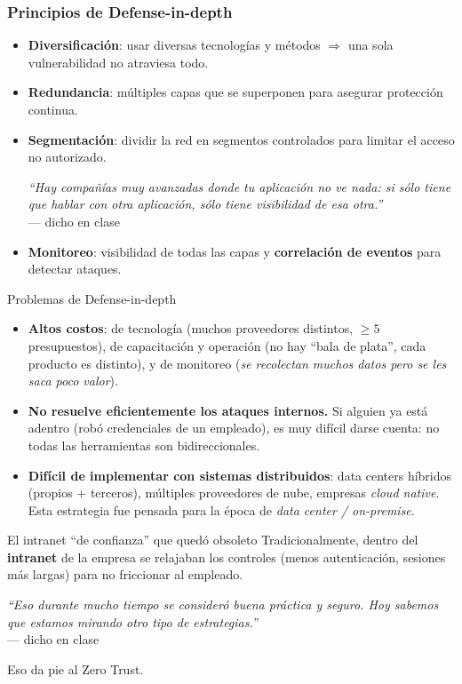 \documentclass[11pt,a4paper]{article}
\newcommand{\prof}[1]{\par\medskip\noindent\textit{``#1''}\\[-2pt]\hspace*{1em}%
  {\footnotesize\textcolor{black!60}{--- dicho en clase}}\par\medskip\noindent}
\begin{document}
\subsubsection{Principios de Defense-in-depth}
\begin{itemize}[leftmargin=1.4em,itemsep=2pt]
  \item \textbf{Diversificación}: usar diversas tecnologías y métodos $\Rightarrow$ una sola
        vulnerabilidad no atraviesa todo.
  \item \textbf{Redundancia}: múltiples capas que se superponen para asegurar protección continua.
  \item \textbf{Segmentación}: dividir la red en segmentos controlados para limitar el acceso no
        autorizado. \prof{Hay compañías muy avanzadas donde tu aplicación no ve nada: si sólo
        tiene que hablar con otra aplicación, sólo tiene visibilidad de esa otra.}
  \item \textbf{Monitoreo}: visibilidad de todas las capas y \textbf{correlación de eventos}
        para detectar ataques.
\end{itemize}

\begin{warnbox}{Problemas de Defense-in-depth}
\begin{itemize}[leftmargin=1.4em,itemsep=1pt]
  \item \textbf{Altos costos}: de tecnología (muchos proveedores distintos, $\geq 5$
        presupuestos), de capacitación y operación (no hay ``bala de plata'', cada producto es
        distinto), y de monitoreo (\emph{se recolectan muchos datos pero se les saca poco
        valor}).
  \item \textbf{No resuelve eficientemente los ataques internos.} Si alguien ya está adentro
        (robó credenciales de un empleado), es muy difícil darse cuenta: no todas las
        herramientas son bidireccionales.
  \item \textbf{Difícil de implementar con sistemas distribuidos}: data centers híbridos
        (propios + terceros), múltiples proveedores de nube, empresas \emph{cloud native}. Esta
        estrategia fue pensada para la época de \emph{data center / on-premise}.
\end{itemize}
\end{warnbox}

\begin{anecbox}{El intranet ``de confianza'' que quedó obsoleto}
Tradicionalmente, dentro del \textbf{intranet} de la empresa se relajaban los controles (menos
autenticación, sesiones más largas) para no friccionar al empleado. \prof{Eso durante mucho
tiempo se consideró buena práctica y seguro. Hoy sabemos que estamos mirando otro tipo de
estrategias.} Eso da pie al Zero Trust.
\end{anecbox}
\end{document}

